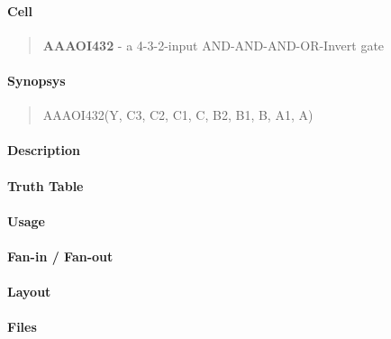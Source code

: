 \label{AAAOI432}
\paragraph{Cell}
\begin{quote}
    \textbf{AAAOI432} - a 4-3-2-input AND-AND-AND-OR-Invert gate
\end{quote}

\paragraph{Synopsys}
\begin{quote}
    AAAOI432(Y, C3, C2, C1, C, B2, B1, B, A1, A)
\end{quote}

\paragraph{Description}

%

\paragraph{Truth Table}
%

\paragraph{Usage}

\paragraph{Fan-in / Fan-out}

\paragraph{Layout}

\paragraph{Files}
